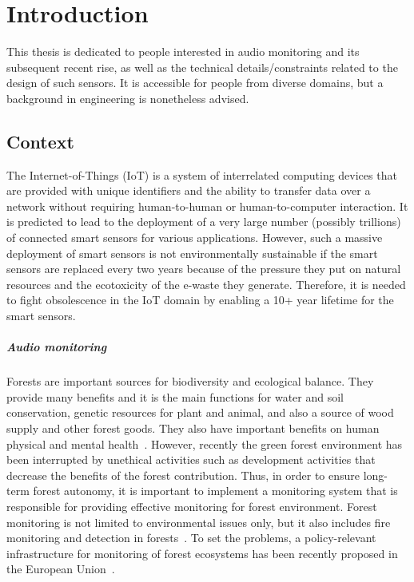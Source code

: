 \documentclass{EPL-master-thesis-covers-EN}
\begin{document}
\tableofcontents

\listoffigures

\listoftables

\newpage

\hypersetup{pageanchor=true}


\chapter{Introduction}

This thesis is dedicated to people interested in audio monitoring and its subsequent recent rise, as well as the technical details/constraints related to the design of such sensors. It is accessible for people from diverse domains, but a background in engineering is nonetheless advised.

\section*{Context}

The Internet-of-Things (IoT) is a system of interrelated computing devices that are provided with unique identifiers and the ability to transfer data over a network without requiring human-to-human or human-to-computer interaction. It is predicted to lead to the deployment of a very large number (possibly trillions) of connected smart sensors for various applications. However, such a massive deployment of smart sensors is not environmentally sustainable if the smart sensors are replaced every two years because of the pressure they put on natural resources and the ecotoxicity of the e-waste they generate. Therefore, it is needed to fight obsolescence in the IoT domain by enabling a 10+ year lifetime for the smart sensors. 

\paragraph{Audio monitoring}

Forests are important sources for biodiversity and ecological balance. They provide many benefits and it is the main functions for water and soil conservation, genetic resources for plant and animal, and also a source of wood supply and other forest goods. They also have important benefits on human physical and mental health~\cite{Meyer-Schulz}. However, recently the green forest environment has been interrupted by unethical activities such as development activities that decrease the benefits of the forest contribution.
Thus, in order to ensure long-term forest autonomy, it is important to implement a monitoring system that is responsible for providing effective monitoring for forest environment. Forest monitoring is not limited to environmental issues only, but it also includes fire monitoring and detection in forests~\cite{OTHMAN20121204}. To set the problems, a policy-relevant infrastructure for monitoring of forest ecosystems has been recently proposed in the European Union~\cite{ICP_Forests}.
\end{document}
